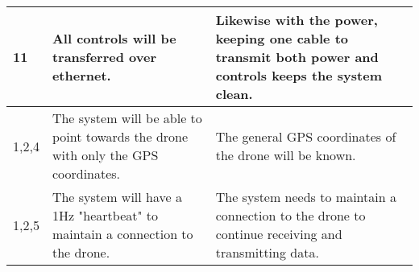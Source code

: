 \documentclass[ProjectRequirements.tex]{subfiles}
\begin{document}
\begin{center}
\begin{tabular}{| p{2.3cm} | p{5cm} | p{7cm} |}
		11 & All controls will be transferred over ethernet. &  Likewise with the power, keeping one cable to transmit both power and controls keeps the system clean.\\\hline
		1,2,4 & The system will be able to point towards the drone with only the GPS coordinates. & The general GPS coordinates of the drone will be known.    \\\hline
		1,2,5 & The system will have a 1Hz "heartbeat" to maintain a connection to the drone. & The system needs to maintain a connection to the drone to continue receiving and transmitting data.    \\\hline
	\end{tabular}
	\end{center}
\end{document}

